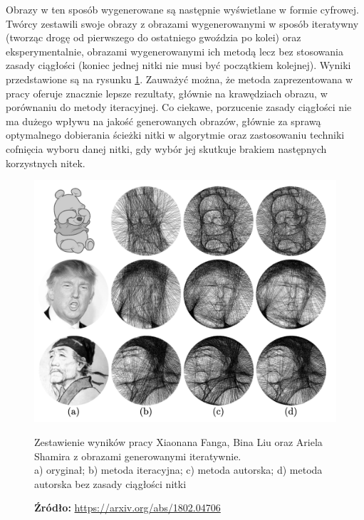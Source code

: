 \documentclass[a4paper, 12pt, polish, twoside]{extreport}
\begin{document}
        Obrazy w ten sposób wygenerowane są następnie wyświetlane w formie cyfrowej. Twórcy zestawili swoje obrazy z obrazami wygenerowanymi w sposób iteratywny (tworząc drogę od pierwszego do ostatniego gwoździa po kolei) oraz eksperymentalnie, obrazami wygenerowanymi ich metodą lecz bez stosowania zasady ciągłości (koniec jednej nitki nie musi być początkiem kolejnej). Wyniki przedstawione są na rysunku \ref{przyklad-testowy-xin}. Zauważyć można, że metoda zaprezentowana w pracy oferuje znacznie lepsze rezultaty, głównie na krawędziach obrazu, w porównaniu do metody iteracyjnej. Co ciekawe, porzucenie zasady ciągłości nie ma dużego wpływu na jakość generowanych obrazów, głównie za sprawą optymalnego dobierania ścieżki nitki w algorytmie oraz zastosowaniu techniki cofnięcia wyboru danej nitki, gdy wybór jej skutkuje brakiem następnych korzystnych nitek. 
        \begin{figure}[H]
            \centering
            \includegraphics[width=\textwidth,keepaspectratio]{img/3-others/xin-vs-greedy.png}
            \caption[Zestawienie wyników pracy Xiaonana Fanga, Bina Liu oraz Ariela Shamira z obrazami generowanymi iteratywnie]{Zestawienie wyników pracy Xiaonana Fanga, Bina Liu oraz Ariela Shamira z obrazami generowanymi iteratywnie. \\ a) oryginał; b) metoda iteracyjna; c) metoda autorska; d) metoda autorska bez zasady ciągłości nitki}
            \caption*{\footnotesize{\textbf{Źródło:} {\url{https://arxiv.org/abs/1802.04706}}}}
            \label{przyklad-testowy-xin}
        \end{figure}
            
\end{document}
